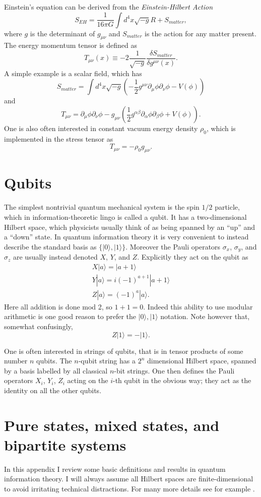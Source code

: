 \documentclass[12pt]{article}
\newcommand{\be}{\begin{equation}}
\newcommand{\ee}{\end{equation}}
\newcommand{\ran}{\rangle}
\begin{document}
Einstein's equation can be derived from the \textit{Einstein-Hilbert Action}
\be
S_{EH}=\frac{1}{16\pi G}\int d^4 x \sqrt{-g}R+S_{matter},
\ee
where $g$ is the determinant of $g_{\mu\nu}$ and $S_{matter}$ is the action for any matter present.  The energy momentum tensor is defined as
\be
T_{\mu\nu}(x)\equiv -2\frac{1}{\sqrt{-g}}\frac{\delta S_{matter}}{\delta g^{\mu\nu}(x)}.
\ee
A simple example is a scalar field, which has
\be
S_{matter}=\int d^4 x \sqrt{-g}\left(-\frac{1}{2} g^{\mu\nu}\partial_\mu \phi \partial_\nu \phi-V(\phi)\right)
\ee
and
\be
T_{\mu\nu}=\partial_\mu\phi\partial_\nu \phi-g_{\mu\nu}\left(\frac{1}{2}g^{\alpha\beta}\partial_\alpha \phi \partial_\beta \phi+V(\phi)\right).
\ee
One is also often interested in constant vacuum energy density $\rho_0$, which is implemented in the stress tensor as
\be
T_{\mu\nu}=-\rho_0 g_{\mu\nu}.
\ee

\section{Qubits}\label{qubitapp}
The simplest nontrivial quantum mechanical system is the spin $1/2$ particle, which in information-theoretic lingo is called a qubit.  It has a two-dimensional Hilbert space, which physicists usually think of as being spanned by an ``up'' and a ``down'' state.  In quantum information theory it is very convenient to instead describe the standard basis as $\{|0\ran,|1\ran\}$.  Moreover the Pauli operators $\sigma_x$, $\sigma_y$, and $\sigma_z$ are usually instead denoted $X$, $Y$, and $Z$.  Explicitly they act on the qubit as
\begin{align}\nonumber
X|a\ran=|a+1\ran\\\nonumber
Y|a\ran=i(-1)^{a+1}|a+1\ran\\
Z|a\ran=(-1)^a |a\ran.
\end{align}
Here all addition is done mod 2, so $1+1=0$.  Indeed this ability to use modular arithmetic is one good reason to prefer the $|0\ran,|1\ran$ notation.  Note however that, somewhat confusingly, 
\be
Z|1\ran=-|1\ran.
\ee

One is often interested in strings of qubits, that is in tensor products of some number $n$ qubits.  The $n$-qubit string has a $2^n$ dimensional Hilbert space, spanned by a basis labelled by all classical $n$-bit strings.  One then defines the Pauli operators $X_i$, $Y_i$, $Z_i$ acting on the $i$-th qubit in the obvious way; they act as the identity on all the other qubits.  

\section{Pure states, mixed states, and bipartite systems}\label{BPapp}
In this appendix I review some basic definitions and results in quantum information theory.  I will always assume all Hilbert spaces are finite-dimensional to avoid irritating technical distractions.  For many more details see for example \cite{preskillnotes,nielsen2010quantum}.  
\end{document}
